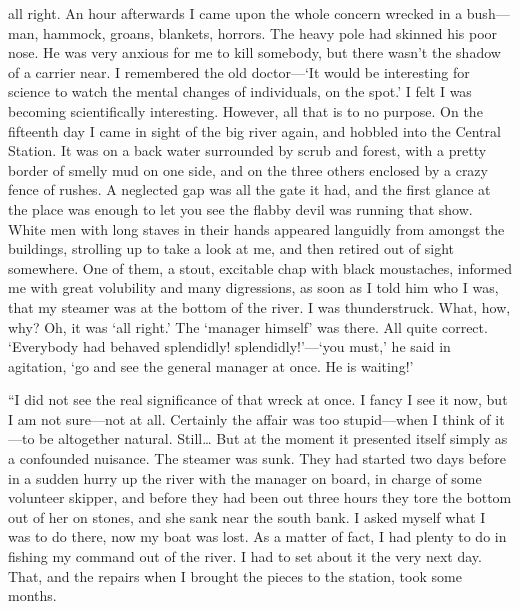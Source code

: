 \documentclass[12pt]{report}
\begin{document}
all right. An hour afterwards I came upon the whole concern wrecked in a
bush---man, hammock, groans, blankets, horrors. The heavy pole had
skinned his poor nose. He was very anxious for me to kill somebody, but
there wasn't the shadow of a carrier near. I remembered the old
doctor---`It would be interesting for science to watch the mental
changes of individuals, on the spot.' I felt I was becoming
scientifically interesting. However, all that is to no purpose. On the
fifteenth day I came in sight of the big river again, and hobbled into
the Central Station. It was on a back water surrounded by scrub and
forest, with a pretty border of smelly mud on one side, and on the three
others enclosed by a crazy fence of rushes. A neglected gap was all the
gate it had, and the first glance at the place was enough to let you see
the flabby devil was running that show. White men with long staves in
their hands appeared languidly from amongst the buildings, strolling up
to take a look at me, and then retired out of sight somewhere. One of
them, a stout, excitable chap with black moustaches, informed me with
great volubility and many digressions, as soon as I told him who I was,
that my steamer was at the bottom of the river. I was thunderstruck.
What, how, why? Oh, it was `all right.' The `manager himself' was there.
All quite correct. `Everybody had behaved splendidly!
splendidly!'---`you must,' he said in agitation, `go and see the general
manager at once. He is waiting!'

``I did not see the real significance of that wreck at once. I fancy I
see it now, but I am not sure---not at all. Certainly the affair was too
stupid---when I think of it---to be altogether natural. Still\ldots{}
But at the moment it presented itself simply as a confounded nuisance.
The steamer was sunk. They had started two days before in a sudden hurry
up the river with the manager on board, in charge of some volunteer
skipper, and before they had been out three hours they tore the bottom
out of her on stones, and she sank near the south bank. I asked myself
what I was to do there, now my boat was lost. As a matter of fact, I had
plenty to do in fishing my command out of the river. I had to set about
it the very next day. That, and the repairs when I brought the pieces to
the station, took some months.
\end{document}

